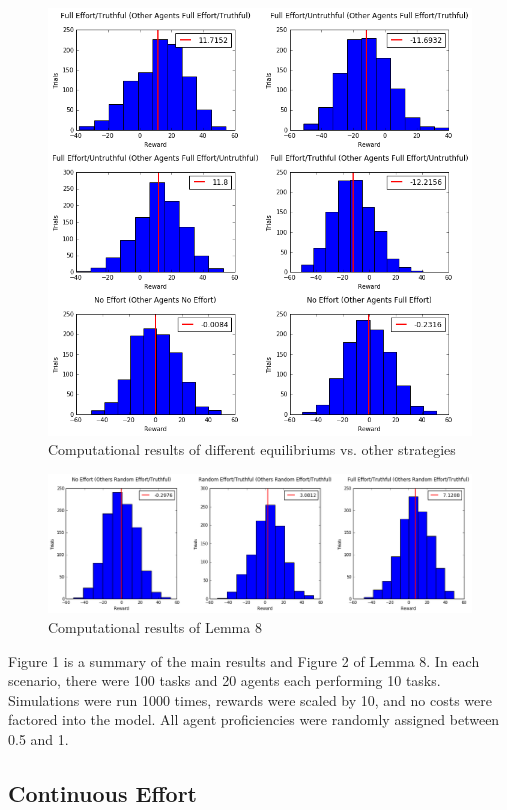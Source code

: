 \documentclass{scrartcl}
\begin{document}
\begin{figure}[H]
	\caption{Computational results of different equilibriums vs. other strategies}
	\centering
	\includegraphics[width=1.0\textwidth]{cs_equilibriums}
\end{figure}
\begin{figure}[H]
	\caption{Computational results of Lemma 8}
	\centering
	\includegraphics[width=1.0\textwidth]{cs_lemma8}
\end{figure}

Figure 1 is a summary of the main results and Figure 2 of Lemma 8. In each scenario, there were 100 tasks and 20 agents each performing 10 tasks. Simulations were run 1000 times, rewards were scaled by 10, and no costs were factored into the model. All agent proficiencies were randomly assigned between 0.5 and 1.

\subsection{Continuous Effort}
\end{document}
